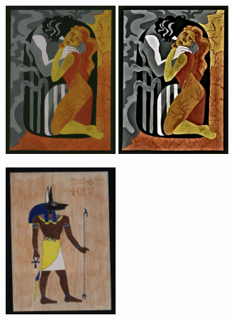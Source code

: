 \begin{figure}
\begin{subfigure}[b]{0.5\textwidth}
         \caption{}
     \end{subfigure}
     \hfil
     \begin{subfigure}[b]{0.5\textwidth}
         \centering
         \includegraphics[width=0.45\textwidth]{images/style_augments/2020_14-17_2051_UKR_R_C.jpg}\hfil
         \includegraphics[width=0.45\textwidth]{images/style_augments/2020_14-17_2051_UKR_R_C_texture.jpg}
         \caption{}
     \end{subfigure}
     \hfil
     \begin{subfigure}[b]{0.5\textwidth}
         \centering
         \includegraphics[width=0.45\textwidth]{images/style_augments/2019_14-17_0188_RUS_R_C.jpg}\hfil

\end{subfigure}
\end{figure}

